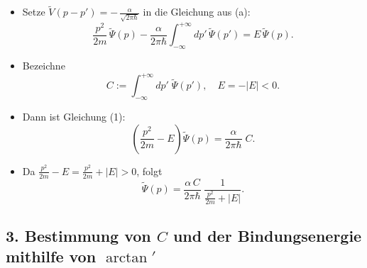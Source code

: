 \documentclass[12pt,a4paper]{scrartcl}
\begin{document}
\begin{itemize}
  \item Setze $\widetilde V(p-p') = -\,\frac{\alpha}{\sqrt{2\pi\hbar}}$ in die Gleichung aus (a):
  \[
    \frac{p^2}{2m}\,\widetilde\Psi(p)
    - \frac{\alpha}{2\pi\hbar} \int_{-\infty}^{+\infty} dp'\,\widetilde\Psi(p') 
    = E\,\widetilde\Psi(p).
    \tag{1}
  \]
  \item Bezeichne
  \[
    C := \int_{-\infty}^{+\infty} dp'\;\widetilde\Psi(p'),
    \quad E = -|E|<0.
    \tag{2}
  \]
  \item Dann ist Gleichung (1):
  \[
    \left(\frac{p^2}{2m} - E\right)\widetilde\Psi(p)
    = \frac{\alpha}{2\pi\hbar}\;C.
    \tag{3}
  \]
  \item Da $\frac{p^2}{2m} - E = \frac{p^2}{2m} + |E| > 0$, folgt
  \[
    \widetilde\Psi(p)
    = \frac{\alpha\,C}{2\pi\hbar}\;\frac{1}{\frac{p^2}{2m} + |E|}.
    \tag{4}
  \]
\end{itemize}

\subsection*{3. Bestimmung von $C$ und der Bindungsenergie mithilfe von $\arctan'$}
\end{document}
